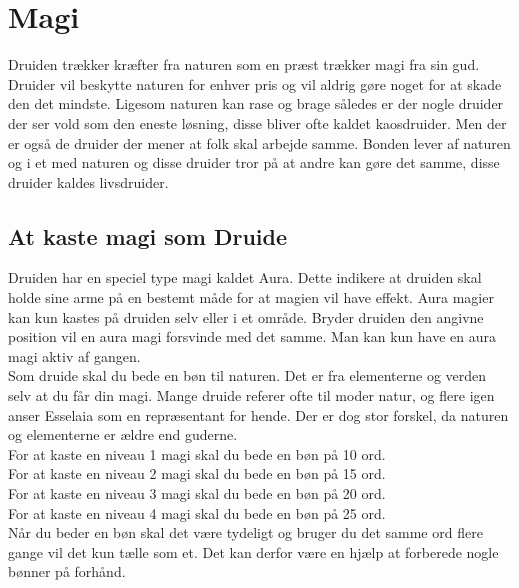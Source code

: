 \chapter*{Magi}

Druiden trækker kræfter fra naturen som en præst trækker magi fra sin gud. Druider vil beskytte naturen for enhver pris og vil aldrig gøre noget for at skade den det mindste. Ligesom naturen kan rase og brage således er der nogle druider der ser vold som den eneste løsning, disse bliver ofte kaldet kaosdruider. Men der er også de druider der mener at folk skal arbejde samme. Bonden lever af naturen og i et med naturen og disse druider tror på at andre kan gøre det samme, disse druider kaldes livsdruider.


\section*{At kaste magi som Druide}

Druiden har en speciel type magi kaldet Aura. Dette indikere at druiden skal holde sine arme på en bestemt måde for at magien vil have effekt. Aura magier kan kun kastes på druiden selv eller i et område. Bryder druiden den angivne position vil en aura magi forsvinde med det samme. Man kan kun have en aura magi aktiv af gangen.\\

Som druide skal du bede en bøn til naturen. Det er fra elementerne og verden selv at du får din magi. Mange druide referer ofte til moder natur, og flere igen anser Esselaia som en repræsentant for hende. Der er dog stor forskel, da naturen og elementerne er ældre end guderne.\\

For at kaste en niveau 1 magi skal du bede en bøn på 10 ord.\\
For at kaste en niveau 2 magi skal du bede en bøn på 15 ord.\\
For at kaste en niveau 3 magi skal du bede en bøn på 20 ord.\\
For at kaste en niveau 4 magi skal du bede en bøn på 25 ord.\\

Når du beder en bøn skal det være tydeligt og bruger du det samme ord flere gange vil det kun tælle som et. Det kan derfor være en hjælp at forberede nogle bønner på forhånd.

